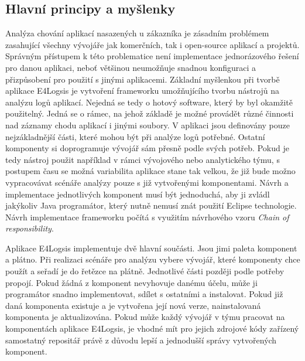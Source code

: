\documentclass[ing,male,java,dept460]{diploma}		%
\begin{document}
\subsection{Hlavní principy a myšlenky}
Analýza chování aplikací nasazených u zákazníka je zásadním problémem zasahující všechny vývojáře jak komerčních, tak i open-source aplikací a projektů. Správným přístupem k této problematice není implementace jednorázového řešení pro danou aplikaci, neboť většinou neumožňuje snadnou konfiguraci a přizpůsobení pro použití s jinými aplikacemi. Základní myšlenkou při tvorbě aplikace E4Logsis je vytvoření frameworku umožňujícího tvorbu nástrojů na analýzu logů aplikací. Nejedná se tedy o hotový software, který by byl okamžitě použitelný. Jedná se o rámec, na jehož základě je možné provádět různé činnosti nad záznamy chodu aplikací i jinými soubory. V aplikaci jsou definovány pouze nejzákladnější části, které mohou být při analýze logů potřebné. Ostatní komponenty si doprogramuje vývojář sám přesně podle svých potřeb. Pokud je tedy nástroj použit například v rámci vývojového nebo analytického týmu, s postupem času se možná variabilita aplikace stane tak velkou, že již bude možno vypracovávat scénáře analýzy pouze s již vytvořenými komponentami. Návrh a implementace jednotlivých komponent musí být jednoduchá, aby ji zvládl jakýkoliv Java programátor, který nutně nemusí znát použití Eclipse technologie. Návrh implementace frameworku počítá s využitím návrhového vzoru \textit{Chain of responsibility}.
\par Aplikace E4Logsis implementuje dvě hlavní součásti. Jsou jimi paleta komponent a plátno. Při realizaci scénáře pro analýzu vybere vývojář, které komponenty chce použít a seřadí je do řetězce na plátně. Jednotlivé části později podle potřeby propojí. Pokud žádná z komponent nevyhovuje danému účelu, může ji programátor snadno implementovat, sdílet s ostatními a instalovat. Pokud již daná komponenta existuje a je vytvořena její nová verze, nainstalovaná komponenta je aktualizována. Pokud může každý vývojář v týmu pracovat na komponentách aplikace E4Logsis, je vhodné mít pro jejich zdrojové kódy zařízený samostatný repositář právě z důvodu lepší a jednodušší správy vytvořených komponent.
\end{document}
